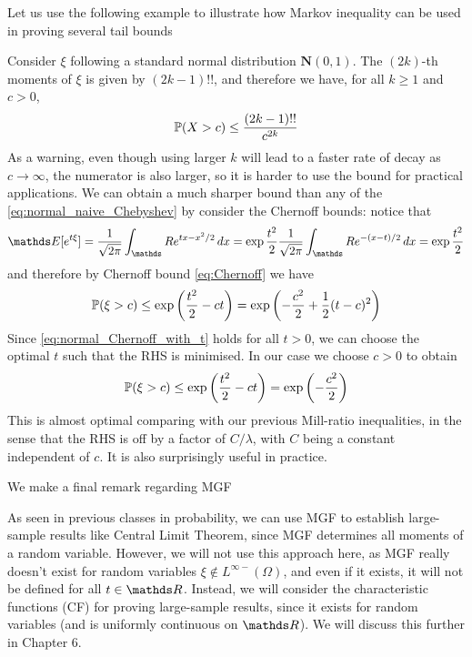Let us use the following example to illustrate how Markov inequality can be used in proving several tail bounds
\begin{example} Consider $\xi$ following a standard normal distribution $\mathbf{N}(0,1)$. The $(2k)$-th moments of $\xi$ is given by $(2k-1)!!$, and therefore we have, for all $k \geq 1$ and $c > 0$,
\begin{equation} \label{eq:normal_naive_Chebyshev}
    \mathbb{P}(X > c) \leq \frac{(2k-1)!!}{c^{2k}}
\end{equation}
As a warning, even though using larger $k$ will lead to a faster rate of decay as $c \to \infty$, the numerator is also larger, so it is harder to use the bound for practical applications. We can obtain a much sharper bound than any of the \eqref{eq:normal_naive_Chebyshev} by consider the Chernoff bounds: notice that
\begin{equation}
    \E[e^{t\xi}] = \frac{1}{\sqrt{2\pi}}\int_\R e^{tx - x^2/2} \, dx = \exp{\frac{t^2}{2}} \frac{1}{\sqrt{2\pi}}\int_\R e^{-(x-t)/2} \, dx = \exp{\frac{t^2}{2}}
\end{equation}
and therefore by Chernoff bound \eqref{eq:Chernoff} we have
\begin{equation} \label{eq:normal_Chernoff_with_t}
    \mathbb{P}(\xi > c) \leq \exp\left( \frac{t^2}{2} - ct \right) = \exp\left( -\frac{c^2}{2} + \frac{1}{2}(t-c)^2 \right)
\end{equation}
Since \eqref{eq:normal_Chernoff_with_t} holds for all $t > 0$, we can choose the optimal $t$ such that the RHS is minimised. In our case we choose $c > 0$ to obtain
\begin{equation} \label{eq:normal_Chernoff}
    \mathbb{P}(\xi > c) \leq \exp\left( \frac{t^2}{2} - ct \right) = \exp\left( -\frac{c^2}{2} \right)
\end{equation}
This is almost optimal comparing with our previous Mill-ratio inequalities, in the sense that the RHS is off by a factor of $C/\lambda$, with $C$ being a constant independent of $c$. It is also surprisingly useful in practice.
\end{example}

\begin{unexaminable}
We make a final remark regarding MGF
\begin{remark}
As seen in previous classes in probability, we can use MGF to establish large-sample results like Central Limit Theorem, since MGF determines all moments of a random variable. However, we will not use this approach here, as MGF really doesn't exist for random variables $\xi \notin L^{\infty-}(\Omega)$, and even if it exists, it will not be defined for all $t \in \R$. Instead, we will consider the characteristic functions (CF) for proving large-sample results, since it exists for random variables (and is uniformly continuous on $\R$). We will discuss this further in Chapter 6.
\end{remark}
\end{unexaminable}
\newpage